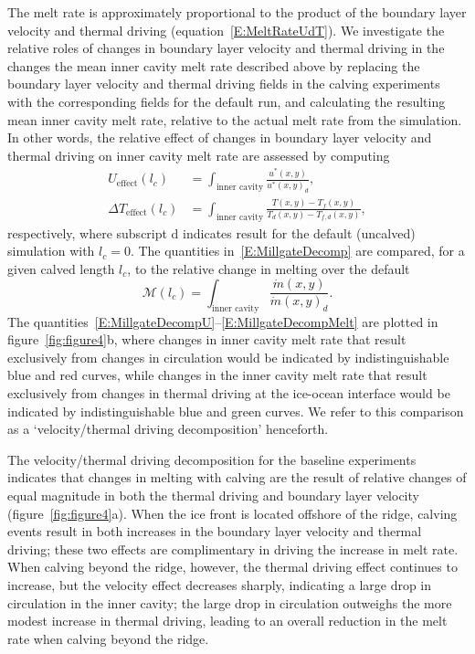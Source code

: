 \documentclass[draft]{agujournal2019}
\begin{document}
The melt rate is approximately proportional to the product of the boundary layer velocity and thermal driving (equation~\eqref{E:MeltRateUdT}). We investigate the relative roles of changes in boundary layer velocity and thermal driving in the changes the mean inner cavity melt rate described above by replacing the boundary layer velocity and thermal driving fields in the calving experiments with the corresponding fields for the default run, and calculating the resulting mean inner cavity melt rate, relative to the actual melt rate from the simulation. In other words, the relative effect of changes in boundary layer velocity and thermal driving on inner cavity melt rate are assessed by computing
 \begin{align}
U_{\text{effect}}(l_c) &=  \int_{\text{inner cavity}}\frac{u^*(x,y)}{u^*(x,y)_d}, \label{E:MillgateDecompU}\\ \Delta T_{\text{effect}}(l_c) &= \int_{\text{inner cavity}}\frac{T(x,y) - T_f(x,y)}{T_d(x,y) - T_{f,d}(x,y)},\label{E:MillgateDecompDT}
 \end{align}
  respectively, where subscript d indicates result for the default (uncalved) simulation with $l_c = 0$. The quantities in~\eqref{E:MillgateDecomp} are compared, for a given calved length $l_c$, to the relative change in melting over the default
 \begin{equation}\label{E:MillgateDecompMelt}
   \mathcal{M}(l_c) =  \int_{\text{inner cavity}}\frac{\dot{m}(x,y)}{\dot{m}(x,y)_d}.
 \end{equation}
The quantities~\eqref{E:MillgateDecompU}--\eqref{E:MillgateDecompMelt} are plotted in figure~\ref{fig:figure4}b, where changes in inner cavity melt rate that result exclusively from changes in circulation would be indicated by indistinguishable blue and red curves, while changes in the inner cavity melt rate that result exclusively from changes in thermal driving at the ice-ocean interface would be indicated by indistinguishable blue and green curves. We refer to this comparison as a `velocity/thermal driving decomposition' henceforth.

The velocity/thermal driving decomposition for the baseline experiments indicates that changes in melting with calving are the result of relative changes of equal magnitude in both the thermal driving and boundary layer velocity (figure~\ref{fig:figure4}a). When the ice front is located offshore of the ridge, calving events result in both increases in the boundary layer velocity and thermal driving; these two effects are complimentary in driving the increase in melt rate. When calving beyond the ridge, however, the thermal driving effect continues to increase, but the velocity effect decreases sharply, indicating a large drop in circulation in the inner cavity; the large drop in circulation outweighs the more modest increase in thermal driving, leading to an overall reduction in the melt rate when calving beyond the ridge.
\end{document}
